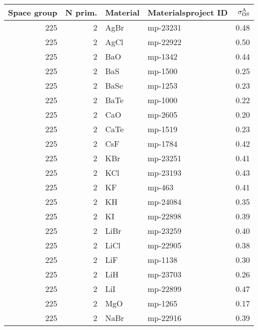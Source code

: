 \begin{table}[t]
\small
\begin{tabular}{rrllr}
\toprule
 Space group &  N prim. &     Material & Materialsproject ID &  $\sigma^\mathrm{A}_\mathrm{OS}$ \\
\midrule
         225 &            2 &         AgBr &   mp-23231 &       0.48 \\
         225 &            2 &         AgCl &   mp-22922 &       0.50 \\
         225 &            2 &          BaO &    mp-1342 &       0.44 \\
         225 &            2 &          BaS &    mp-1500 &       0.25 \\
         225 &            2 &         BaSe &    mp-1253 &       0.23 \\
         225 &            2 &         BaTe &    mp-1000 &       0.22 \\
         225 &            2 &          CaO &    mp-2605 &       0.20 \\
         225 &            2 &         CaTe &    mp-1519 &       0.23 \\
         225 &            2 &          CsF &    mp-1784 &       0.42 \\
         225 &            2 &          KBr &   mp-23251 &       0.41 \\
         225 &            2 &          KCl &   mp-23193 &       0.43 \\
         225 &            2 &           KF &     mp-463 &       0.41 \\
         225 &            2 &           KH &   mp-24084 &       0.35 \\
         225 &            2 &           KI &   mp-22898 &       0.39 \\
         225 &            2 &         LiBr &   mp-23259 &       0.40 \\
         225 &            2 &         LiCl &   mp-22905 &       0.38 \\
         225 &            2 &          LiF &    mp-1138 &       0.30 \\
         225 &            2 &          LiH &   mp-23703 &       0.26 \\
         225 &            2 &          LiI &   mp-22899 &       0.47 \\
         225 &            2 &          MgO &    mp-1265 &       0.17 \\
         225 &            2 &         NaBr &   mp-22916 &       0.39 \\

\end{tabular}
\end{table}
